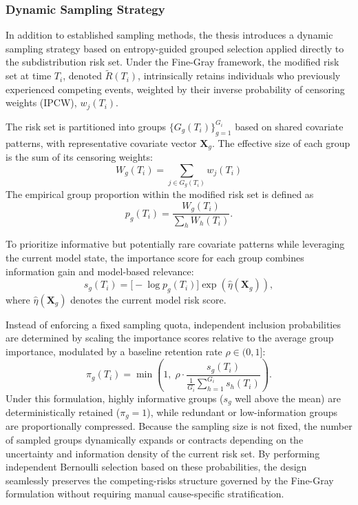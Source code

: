 \documentclass[a4paper,twoside,12pt]{report}
\begin{document}


\subsubsection{Dynamic Sampling Strategy}
In addition to established sampling methods, the thesis introduces a dynamic sampling strategy based on entropy-guided grouped selection applied directly to the subdistribution risk set. Under the Fine-Gray framework, the modified risk set at time $T_i$, denoted $\tilde{R}(T_i)$, intrinsically retains individuals who previously experienced competing events, weighted by their inverse probability of censoring weights (IPCW), $w_j(T_i)$.

The risk set is partitioned into groups $\{G_g(T_i)\}_{g=1}^{G_i}$ based on shared covariate patterns, with representative covariate vector $\boldsymbol{X}_g$. The effective size of each group is the sum of its censoring weights:
\[
W_g(T_i) = \sum_{j \in G_g(T_i)} w_j(T_i)
\]
The empirical group proportion within the modified risk set is defined as
\[
p_g(T_i)=\frac{W_g(T_i)}{\sum_h W_h(T_i)}.
\]

To prioritize informative but potentially rare covariate patterns while leveraging the current model state, the importance score for each group combines information gain and model-based relevance:
\[
s_g(T_i)=\bigl[-\log p_g(T_i)\bigr]\exp(\hat{\eta}(\boldsymbol{X}_g)),
\]
where $\hat{\eta}(\boldsymbol{X}_g)$ denotes the current model risk score. 

Instead of enforcing a fixed sampling quota, independent inclusion probabilities are determined by scaling the importance scores relative to the average group importance, modulated by a baseline retention rate $\rho \in (0, 1]$:
\[
\pi_g(T_i)= \min \left( 1, \;\rho \cdot \frac{s_g(T_i)}{\frac{1}{G_i}\sum_{h=1}^{G_i} s_h(T_i)} \right).
\]
Under this formulation, highly informative groups ($s_g$ well above the mean) are deterministically retained ($\pi_g = 1$), while redundant or low-information groups are proportionally compressed. Because the sampling size is not fixed, the number of sampled groups dynamically expands or contracts depending on the uncertainty and information density of the current risk set. By performing independent Bernoulli selection based on these probabilities, the design seamlessly preserves the competing-risks structure governed by the Fine-Gray formulation without requiring manual cause-specific stratification.
\end{document}

